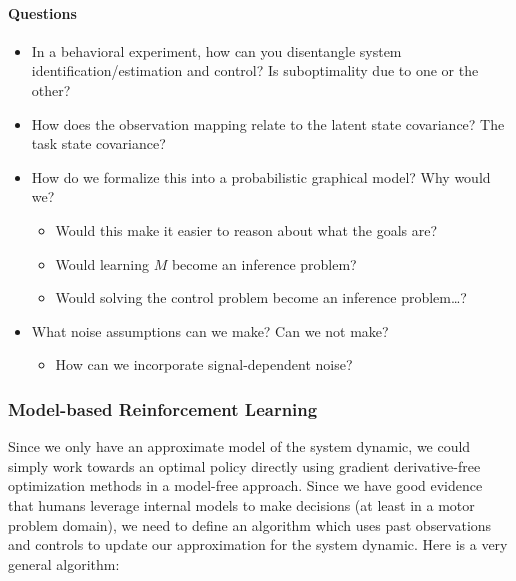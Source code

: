 {            \hypertarget{questions}{%
            \paragraph{Questions}\label{questions}}

            \begin{itemize}
            \tightlist
            \item
              In a behavioral experiment, how can you disentangle system
              identification/estimation and control? Is suboptimality
              due to one or the other?
            \item
              How does the observation mapping relate to the latent
              state covariance? The task state covariance?
            \item
              How do we formalize this into a probabilistic graphical
              model? Why would we?

              \begin{itemize}
              \tightlist
              \item
                Would this make it easier to reason about what the goals
                are?
              \item
                Would learning \(M\) become an inference problem?
              \item
                Would solving the control problem become an inference
                problem\ldots?
              \end{itemize}
            \item
              What noise assumptions can we make? Can we not make?

              \begin{itemize}
              \tightlist
              \item
                How can we incorporate signal-dependent noise?
              \end{itemize}
            \end{itemize}

            \hypertarget{model-based-reinforcement-learning}{%
            \subsubsection{Model-based Reinforcement
            Learning}\label{model-based-reinforcement-learning}}

            Since we only have an approximate model of the system
            dynamic, we could simply work towards an optimal policy
            directly using gradient derivative-free optimization methods
            in a model-free approach. Since we have good evidence that
            humans leverage internal models to make decisions (at least
            in a motor problem domain), we need to define an algorithm
            which uses past observations and controls to update our
            approximation for the system dynamic. Here is a very general
            algorithm:

}
